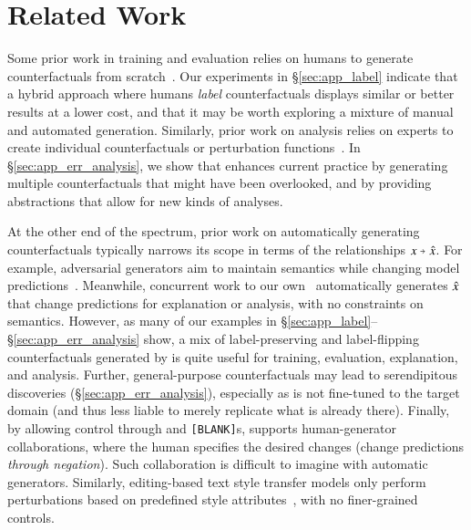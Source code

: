 \section{Related Work}
\label{sec:relate}

Some prior work in training and evaluation relies on humans to generate counterfactuals from scratch~\cite{gardner2020contrast, teney2020learning, kaushik2019learning}. 
Our experiments in \S\ref{sec:app_label} indicate that a hybrid approach where humans \emph{label} \sysname{} counterfactuals displays similar or better results at a lower cost, and that it may be worth exploring a mixture of manual and automated generation. 
Similarly, prior work on analysis relies on experts to create individual counterfactuals or perturbation functions~\cite{wu2019errudite, checklist:acl20}. 
In \S\ref{sec:app_err_analysis}, we show that \sysname{} enhances current practice by generating multiple counterfactuals that might have been overlooked, and by providing abstractions that allow for new kinds of analyses.

At the other end of the spectrum, prior work on automatically generating counterfactuals typically narrows its scope in terms of the relationships $x \veryshortarrow \xp$.
For example, adversarial generators aim to maintain semantics while changing model predictions~\cite{ribeiro2018semantically, iyyer2018adversarial, li2020contextualized}.
Meanwhile, concurrent work to our own~\cite{madaan2020generate, ross2020explaining} automatically generates $\hat{x}$ that change predictions for explanation or analysis, with no constraints on semantics.
However, as many of our examples in \S\ref{sec:app_label}--\S\ref{sec:app_err_analysis} show, a mix of label-preserving and label-flipping counterfactuals generated by \sysname is quite useful for training, evaluation, explanation, and analysis. 
Further, general-purpose counterfactuals may lead to serendipitous discoveries (\S\ref{sec:app_err_analysis}), especially as \sysname is not fine-tuned to the target domain (and thus less liable to merely replicate what is already there).
Finally, by allowing control through \tagstrs and \texttt{[BLANK]}s, \sysname{} supports human-generator collaborations, where the human specifies the desired changes (\eg change predictions \emph{through negation}).
Such collaboration is difficult to imagine with automatic generators.
Similarly, editing-based text style transfer models only perform perturbations based on predefined style attributes~\cite{madaan-etal-2020-politeness, malmi-etal-2020-unsupervised}, with no finer-grained controls.


